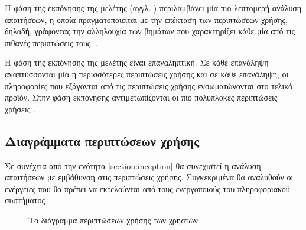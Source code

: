 \documentclass{assignment}
\begin{document}
Η φάση της εκπόνησης της μελέτης (αγγλ. ) περιλαμβάνει μία πιο λεπτομερή ανάλυση απαιτήσεων, η οποία πραγματοποιείται με την επέκταση των περιπτώσεων χρήσης, δηλαδή, γράφοντας την αλληλουχία των βημάτων που χαρακτηρίζει κάθε μία από τις πιθανές περιπτώσεις τους.  \cite{wazlawick2014object}.  
	
Η φάση της εκπόνησης της μελέτης είναι επαναληπτική. Σε κάθε επανάληψη αναπτύσσονται μία ή περισσότερες περιπτώσεις χρήσης και σε κάθε επανάληψη, οι πληροφορίες που εξάγονται από τις περιπτώσεις χρήσης ενσωματώνονται στο τελικό προϊόν. Στην φάση εκπόνησης αντιμετωπίζονται οι πιο πολύπλοκες περιπτώσεις χρήσεις \cite{wazlawick2014object}.

\subsection{Διαγράμματα περιπτώσεων χρήσης}

Σε συνέχεια από την ενότητα \ref{section:inception} θα συνεχιστεί η ανάλυση απαιτήσεων με εμβάθυνση στις περιπτώσεις χρήσης. Συγκεκριμένα θα αναλυθούν οι ενέργειες που θα πρέπει να εκτελούνται από τους ενεργοποιούς του πληροφοριακού συστήματος 

\begin{landscape}
\begin{figure}
\begin{center}
\caption{Το διάγραμμα περιπτώσεων χρήσης των χρηστών}
\label{fig:usecase_diagram_Users}
\end{center}
\end{figure}
\end{landscape}
\end{document}

